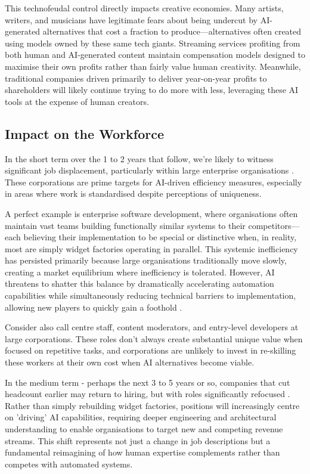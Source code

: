 \documentclass[12pt]{article}
\begin{document}
This technofeudal control directly impacts creative economies. Many artists, writers, and musicians have legitimate fears about being undercut by AI-generated alternatives that cost a fraction to produce—alternatives often created using models owned by these same tech giants. Streaming services profiting from both human and AI-generated content maintain compensation models designed to maximise their own profits rather than fairly value human creativity. Meanwhile, traditional companies driven primarily to deliver year-on-year profits to shareholders will likely continue trying to do more with less, leveraging these AI tools at the expense of human creators.

\subsection{Impact on the Workforce}

In the short term over the 1 to 2 years that follow, we're likely to witness significant job displacement, particularly within large enterprise organisations \citep{frey2017future}. These corporations are prime targets for AI-driven efficiency measures, especially in areas where work is standardised despite perceptions of uniqueness.

A perfect example is enterprise software development, where organisations often maintain vast teams building functionally similar systems to their competitors—each believing their implementation to be special or distinctive when, in reality, most are simply widget factories operating in parallel. This systemic inefficiency has persisted primarily because large organisations traditionally move slowly, creating a market equilibrium where inefficiency is tolerated. However, AI threatens to shatter this balance by dramatically accelerating automation capabilities while simultaneously reducing technical barriers to implementation, allowing new players to quickly gain a foothold \citep{brynjolfsson2014second}.

Consider also call centre staff, content moderators, and entry-level developers at large corporations. These roles don't always create substantial unique value when focused on repetitive tasks, and corporations are unlikely to invest in re-skilling these workers at their own cost when AI alternatives become viable.

In the medium term - perhaps the next 3 to 5 years or so, companies that cut headcount earlier may return to hiring, but with roles significantly refocused \citep{autor2015why}. Rather than simply rebuilding widget factories, positions will increasingly centre on 'driving' AI capabilities, requiring deeper engineering and architectural understanding to enable organisations to target new and competing revenue streams. This shift represents not just a change in job descriptions but a fundamental reimagining of how human expertise complements rather than competes with automated systems.
\end{document}
